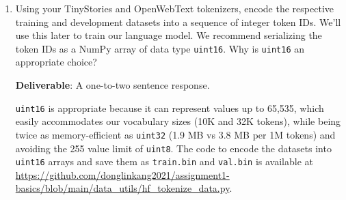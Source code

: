 \begin{enumerate}[label=(\alph*)]
    \item Using your TinyStories and OpenWebText tokenizers, encode the respective training and development datasets into a sequence of integer token IDs. We'll use this later to train our language model. We recommend serializing the token IDs as a NumPy array of data type \lstinline{uint16}. Why is \lstinline{uint16} an appropriate choice?

    \textbf{Deliverable}: A one-to-two sentence response.

    \begin{answer}
    \lstinline{uint16} is appropriate because it can represent values up to 65,535, which easily accommodates our vocabulary sizes (10K and 32K tokens), while being twice as memory-efficient as \lstinline{uint32} (1.9 MB vs 3.8 MB per 1M tokens) and avoiding the 255 value limit of \lstinline{uint8}. The code to encode the datasets into \lstinline{uint16} arrays and save them as \texttt{train.bin} and \texttt{val.bin} is available at \url{https://github.com/donglinkang2021/assignment1-basics/blob/main/data_utils/hf_tokenize_data.py}.
    \end{answer}
\end{enumerate}